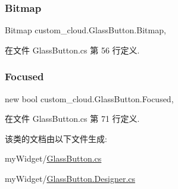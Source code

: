 \subsubsection{\texorpdfstring{Bitmap}{Bitmap}}
{\footnotesize\ttfamily Bitmap custom\+\_\+cloud.\+Glass\+Button.\+Bitmap\hspace{0.3cm}{\ttfamily [get]}, {\ttfamily [set]}}



在文件 Glass\+Button.\+cs 第 56 行定义.

\mbox{\label{classcustom__cloud_1_1_glass_button_ad98d286587f223573b85ac5c0c8af88c}} 
\subsubsection{\texorpdfstring{Focused}{Focused}}
{\footnotesize\ttfamily new bool custom\+\_\+cloud.\+Glass\+Button.\+Focused\hspace{0.3cm}{\ttfamily [get]}, {\ttfamily [set]}}



在文件 Glass\+Button.\+cs 第 71 行定义.



该类的文档由以下文件生成\+:\begin{DoxyCompactItemize}
\item 
my\+Widget/\hyperlink{_glass_button_8cs}{Glass\+Button.\+cs}\item 
my\+Widget/\hyperlink{_glass_button_8_designer_8cs}{Glass\+Button.\+Designer.\+cs}\end{DoxyCompactItemize}
